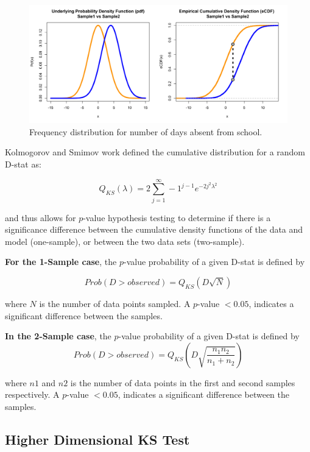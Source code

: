 \documentclass[codesnippet]{jss}
\begin{document}
\begin{figure}[t!]
\centering
\includegraphics{pdfvsCDF}
\caption{\label{fig:kstest1D} Frequency distribution for number of days absent
from school.}
\end{figure}

Kolmogorov and Smimov work defined the cumulative distribution for a random D-stat as:

\begin{equation} \label{eq:1}
Q_{KS}(\lambda) = 2 \sum_{j=1}^{\infty} -1^{j-1}e^{-2j^2\lambda^2}
\end{equation}

and thus allows for $p$-value hypothesis testing to determine if there is a significance difference between the cumulative density functions of the data and model (one-sample), or between the two data sets (two-sample).

\textbf{For the 1-Sample case}, the $p$-value probability of a given D-stat is defined by

\begin{equation} \label{eq:2}
Prob(D > observed) = Q_{KS} ( D\sqrt{N})
\end{equation}

where $N$ is the number of data points sampled. A $p$-value $< 0.05$, indicates a significant difference between the samples.

\textbf{In the 2-Sample case}, the $p$-value probability of a given D-stat is defined by
\begin{equation} \label{eq:3}
Prob(D > observed) = Q_{KS} ( D\sqrt{\frac{n_1n_2}{n_1+n_2}})
\end{equation}

where $n1$ and $n2$ is the number of data points in the first and second samples respectively. A $p$-value $< 0.05$, indicates a significant difference between the samples.

\subsection{Higher Dimensional KS Test}
\end{document}
